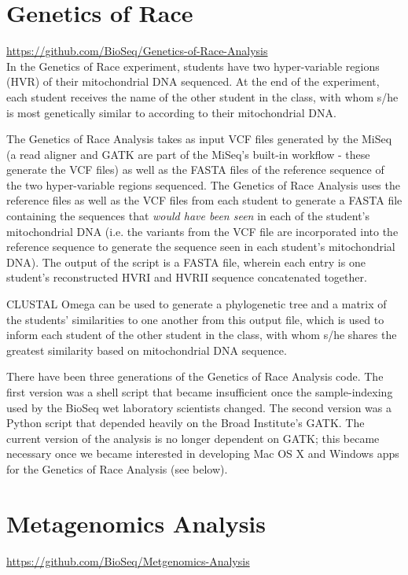 \documentclass{report}
\begin{document}
\section{Genetics of Race}
\url{https://github.com/BioSeq/Genetics-of-Race-Analysis} \\

\noindent In the Genetics of Race experiment, students have two hyper-variable regions (HVR) of their mitochondrial DNA sequenced. At the end of the experiment, each student receives the name of the other student in the class, with whom s/he is most genetically similar to according to their mitochondrial DNA. 

The Genetics of Race Analysis takes as input VCF files generated by the MiSeq (a read aligner and GATK are part of the MiSeq's built-in workflow - these generate the VCF files) as well as the FASTA files of the reference sequence of the two hyper-variable regions sequenced. The Genetics of Race Analysis uses the reference files as well as the VCF files from each student to generate a FASTA file containing the sequences that \emph{would have been seen} in each of the student's mitochondrial DNA (i.e. the variants from the VCF file are incorporated into the reference sequence to generate the sequence seen in each student's mitochondrial DNA). The output of the script is a FASTA file, wherein each entry is one student's reconstructed HVRI and HVRII sequence concatenated together.

CLUSTAL Omega can be used to generate a phylogenetic tree and a matrix of the students' similarities to one another from this output file, which is used to inform each student of the other student in the class, with whom s/he shares the greatest similarity based on mitochondrial DNA sequence.

There have been three generations of the Genetics of Race Analysis code. The first version was a shell script that became insufficient once the sample-indexing used by the BioSeq wet laboratory scientists changed. The second version was a Python script that depended heavily on the Broad Institute's GATK. The current version of the analysis is no longer dependent on GATK; this became necessary once we became interested in developing Mac OS X and Windows apps for the Genetics of Race Analysis (see below).

\section{Metagenomics Analysis}
\url{https://github.com/BioSeq/Metgenomics-Analysis}\\
\end{document}
